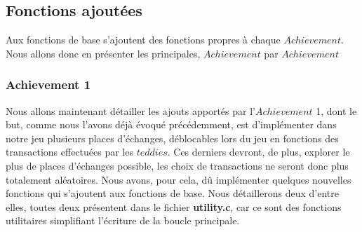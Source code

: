 \documentclass{article}
\begin{document}
\subsection{Fonctions ajoutées} 
Aux fonctions de base s'ajoutent des fonctions propres à chaque $Achievement$. Nous allons donc en présenter les principales, $Achievement$ par $Achievement$

\subsubsection{Achievement 1}
Nous allons maintenant détailler les ajouts apportés par l'$Achievement$ 1, dont le but, comme nous l'avons déjà évoqué précédemment, est d'implémenter dans notre jeu plusieurs places d'échanges, déblocables lors du jeu en fonctions des transactions effectuées par les $teddies$. Ces derniers devront, de plus, explorer le plus de places d'échanges possible, les choix de transactions ne seront donc plus totalement aléatoires. Nous avons, pour cela, dû implémenter quelques nouvelles fonctions qui s'ajoutent aux fonctions de base. Nous détaillerons deux d'entre elles, toutes deux présentent dans le fichier \textbf{utility.c}, car ce sont des fonctions utilitaires simplifiant l'écriture de la boucle principale.
\end{document}
